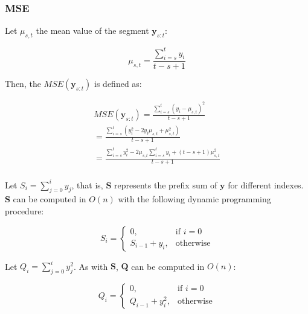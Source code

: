 \subsubsection{MSE}

Let $\mu_{s, t}$ the mean value of the segment $\mathbf{y}_{s : t}$:

\begin{equation}
    \mu_{s, t} = \frac{\sum \limits_{i = s}^{t} y_{i}}{t - s + 1}
\end{equation}

Then, the $MSE(\mathbf{y}_{s : t})$ is defined as:

\begin{equation}
    \label{mse}
    \begin{aligned}
        MSE(\mathbf{y}_{s : t}) = \frac{\sum \limits_{i = s}^{t} (y_{i} - \mu_{s, t})^{2}}{t - s + 1} \\
        = \frac{\sum \limits_{i = s}^{t} (y_{i}^{2} - 2 y_{i} \mu_{s, t} + \mu_{s, t}^{2})}{t - s + 1} \\
        = \frac{\sum \limits_{i = s}^{t} y_{i}^{2} - 2 \mu_{s, t} \sum \limits_{i = s}^{t} y_{i} + (t - s + 1) \mu_{s, t}^{2}}{t - s + 1} \\
    \end{aligned}
\end{equation}

Let $S_{i} = \sum \limits_{j = 0}^{i} y_{j}$, that is, $\mathbf{S}$ represents the prefix sum of $\mathbf{y}$ for different indexes. $\mathbf{S}$ can be computed in $O(n)$ with the following dynamic programming procedure: 

\begin{equation}
    S_{i} = 
    \begin{cases}
        0, & \text{if } i = 0 \\
        S_{i - 1} + y_{i}, & \text{otherwise}
    \end{cases}
\end{equation}

Let $Q_{i} = \sum \limits_{j = 0}^{i} y_{j}^{2}$. As with $\mathbf{S}$, $\mathbf{Q}$ can be computed in $O(n)$: 

\begin{equation}
    Q_{i} = 
    \begin{cases}
        0, & \text{if } i = 0 \\
        Q_{i - 1} + y_{i}^{2}, & \text{otherwise}
    \end{cases}
\end{equation}

